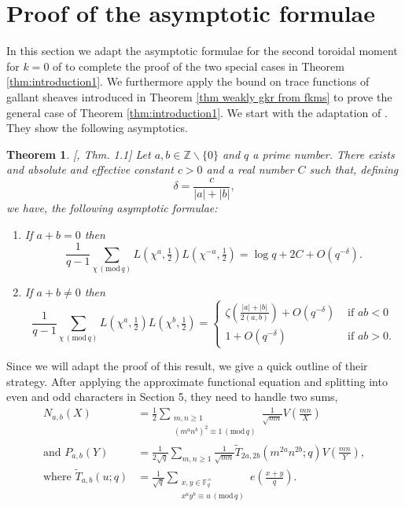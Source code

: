 \documentclass[12pt]{amsart}
\theoremstyle{plain}
\newtheorem{thm}{Theorem}[section]
\theoremstyle{definition}
\theoremstyle{remark}
\numberwithin{equation}{section}
\newcommand{\ZZ}{\mathbb{Z}}
\newcommand{\FF}{\mathbb{F}}
\newcommand{\mods}[1]{\,(\mathrm{mod}\,{#1})}
\renewcommand{\geq}{\geqslant}
\begin{document}
\section{Proof of the asymptotic formulae}\label{s: Adaptation second moment}
In this section we adapt the asymptotic formulae for the second toroidal moment for $k=0$ of \cite{FKMsecondmom} to complete the proof of the two special cases in Theorem \ref{thm:introduction1}. We furthermore apply the bound on trace functions of gallant sheaves introduced in Theorem \ref{thm weakly gkr from fkms} to prove the general case of Theorem \ref{thm:introduction1}. We start with the adaptation of \cite{FKMsecondmom}. They show the following asymptotics. 

\begin{thm}\label{thm second moment k=0}[\cite{FKMsecondmom}, Thm. 1.1]
Let $a,b\in \ZZ\smallsetminus\{0\}$ and $q$ a prime number. There exists and absolute and effective constant $c>0$ and a real number $C$ such that, defining 
$$ \delta=\frac{c}{|a|+|b|},$$ we have, the following asymptotic formulae: 
\begin{enumerate}
    \item If $a+b=0$ then 
    $$\frac{1}{q-1}\sum_{\chi \mods q}L(\chi^a,\tfrac 12)L(\chi^{-a},\tfrac 12)=\log q+2C+O(q^{-\delta}).$$
    \item If $a+b\neq0$ then 
       $$\frac{1}{q-1}\sum_{\chi \mods q}L(\chi^a,\tfrac 12)L(\chi^{b},\tfrac 12)=\begin{cases}
           \zeta\left(\frac{|a|+|b|}{2(a,b)}\right)+O(q^{-\delta}) &\text{ if }ab<0 \\
           1+O(q^{-\delta}) &\text{ if }ab>0.
       \end{cases}$$
\end{enumerate}
\end{thm}
Since we will adapt the proof of this result, we give a quick outline of their strategy. 
After applying the approximate functional equation and splitting into even and odd characters in Section 5, they need to handle two sums, 
\begin{align*}
           N_{a,b}(X)&=\frac 12 \sum_{\substack{m,n\geq 1\\ (m^an^b)^2\equiv 1\mods q}}\frac{1}{\sqrt{mn}}V\left(\frac{mn}{X}\right) \\
    \text{and  }   P_{a,b}(Y)&=\frac{1}{2\sqrt q}\sum_{m,n\geq 1}\frac{1}{\sqrt{mn}}\widetilde{T}_{2a,2b}(m^{2a}n^{2b};q)V\left(\frac{mn}{Y}\right), \\
    \text{where  } 
\widetilde{T}_{a,b}(u;q)&=\frac{1}{\sqrt q}\sum_{\substack{x,y\in \FF_q^\times \\x^ay^b\equiv u \mods q}}e\left(\frac{x+y}{q}\right).
\end{align*}
\end{document}
